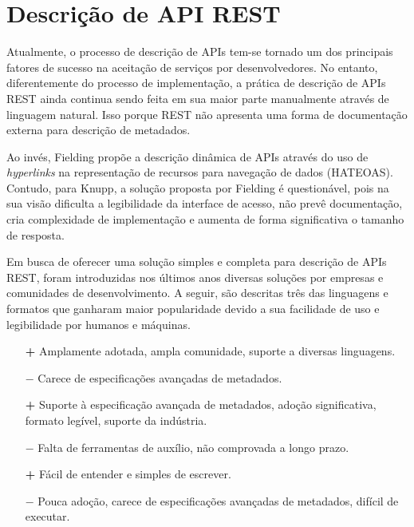 \section[Descrição de API REST]{Descrição de API REST}

Atualmente, o processo de descrição de APIs tem-se tornado um dos principais fatores de sucesso na aceitação de serviços por desenvolvedores. No entanto, diferentemente do processo de implementação, a prática de descrição de APIs REST ainda continua sendo feita em sua maior parte manualmente através de linguagem natural. Isso porque REST não apresenta uma forma de documentação externa para descrição de metadados. \cite{LuckyEtAl2016}

Ao invés, Fielding propõe a descrição dinâmica de APIs através do uso de \textit{hyperlinks} na representação de recursos para navegação de dados (HATEOAS). Contudo, para Knupp, a solução proposta por Fielding é questionável, pois na sua visão dificulta a legibilidade da interface de acesso, não prevê documentação, cria complexidade de implementação e aumenta de forma significativa o tamanho de resposta. \cite{Knupp2016}

Em busca de oferecer uma solução simples e completa para descrição de APIs REST, foram introduzidas nos últimos anos diversas soluções por empresas e comunidades de desenvolvimento. A seguir, são descritas três das linguagens e formatos que ganharam maior popularidade devido a sua facilidade de uso e legibilidade por humanos e máquinas. \cite{Sandoval2015}

\begin{description}[leftmargin=8em,style=nextline]
  \item[\textbf{OpenAPI}]
    \begin{enumerate}
        \item[\textbf{+}] Amplamente adotada, ampla comunidade, suporte a diversas linguagens.
        \item[\textbf{$-$}] Carece de especificações avançadas de metadados.
    \end{enumerate}
  \item[\textbf{RAML}]
    \begin{enumerate}
      \item[\textbf{+}] Suporte à especificação avançada de metadados, adoção significativa, formato legível, suporte da indústria.
       \item[\textbf{$-$}] Falta de ferramentas de auxílio, não comprovada a longo prazo.
    \end{enumerate}
  \item[\textbf{API Blueprint}]
    \begin{enumerate}
      \item[\textbf{+}] Fácil de entender e simples de escrever.
       \item[\textbf{$-$}] Pouca adoção, carece de especificações avançadas de metadados, difícil de executar.
    \end{enumerate}
\end{description}


